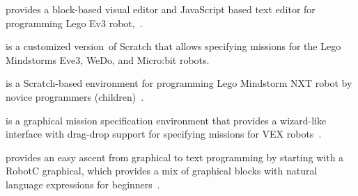 \parhead{\makecode} provides a block-based visual editor and JavaScript based text editor for programming Lego Ev3 robot, %
\,\cite{makecode}.
 
\parhead{\scratchev} is a customized version\,\cite{scratchEv3} of Scratch that allows specifying missions for the Lego Mindstorms Eve3, WeDo, and Micro:bit robots. %

\parhead{\enchanting} is a  Scratch-based environment for programming Lego Mindstorm NXT robot by novice programmers (children)%
\,\cite{enchanting}.%

\parhead{\easyc} is a graphical mission specification environment that provides a wizard-like interface with drag-drop support for specifying missions for VEX robots%
\,\cite{EasyC}. %


\parhead{\robotc} provides an easy ascent from graphical to text programming  by starting with a RobotC graphical, which provides a mix of graphical blocks with natural language expressions for beginners%
\,\cite{robotc}.
